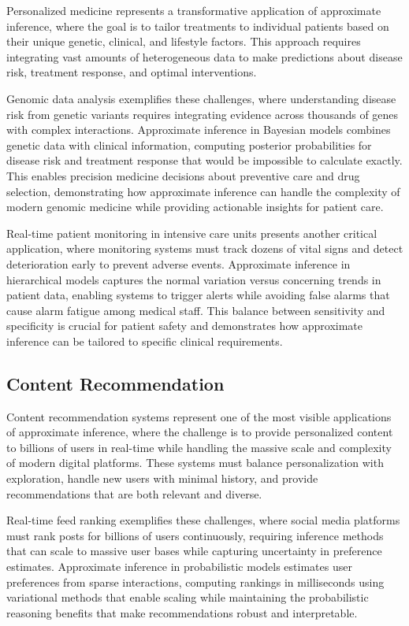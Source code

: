 Personalized medicine represents a transformative application of approximate inference, where the goal is to tailor treatments to individual patients based on their unique genetic, clinical, and lifestyle factors. This approach requires integrating vast amounts of heterogeneous data to make predictions about disease risk, treatment response, and optimal interventions.

Genomic data analysis exemplifies these challenges, where understanding disease risk from genetic variants requires integrating evidence across thousands of genes with complex interactions. Approximate inference in Bayesian models combines genetic data with clinical information, computing posterior probabilities for disease risk and treatment response that would be impossible to calculate exactly. This enables precision medicine decisions about preventive care and drug selection, demonstrating how approximate inference can handle the complexity of modern genomic medicine while providing actionable insights for patient care.

Real-time patient monitoring in intensive care units presents another critical application, where monitoring systems must track dozens of vital signs and detect deterioration early to prevent adverse events. Approximate inference in hierarchical models captures the normal variation versus concerning trends in patient data, enabling systems to trigger alerts while avoiding false alarms that cause alarm fatigue among medical staff. This balance between sensitivity and specificity is crucial for patient safety and demonstrates how approximate inference can be tailored to specific clinical requirements.

\subsection{Content Recommendation}

Content recommendation systems represent one of the most visible applications of approximate inference, where the challenge is to provide personalized content to billions of users in real-time while handling the massive scale and complexity of modern digital platforms. These systems must balance personalization with exploration, handle new users with minimal history, and provide recommendations that are both relevant and diverse.

Real-time feed ranking exemplifies these challenges, where social media platforms must rank posts for billions of users continuously, requiring inference methods that can scale to massive user bases while capturing uncertainty in preference estimates. Approximate inference in probabilistic models estimates user preferences from sparse interactions, computing rankings in milliseconds using variational methods that enable scaling while maintaining the probabilistic reasoning benefits that make recommendations robust and interpretable.

